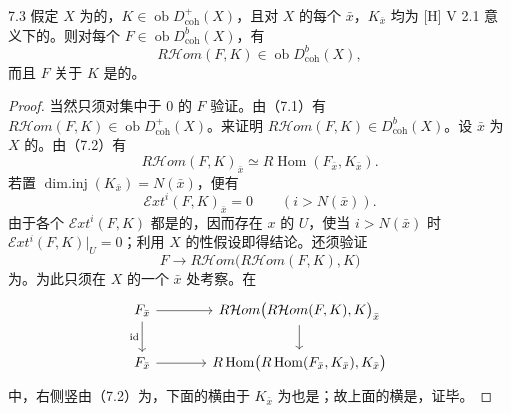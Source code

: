 \begin{SGAresult}{}{7.3}
假定 $X$ 为的，$K\in\operatorname{ob}D^+_{\mathrm{coh}}(X)$，且对 $X$ 的每个 $\bar x$，$K_{\bar x}$ 均为 [H] V 2.1 意义下的。则对每个 $F\in\operatorname{ob}D^b_{\mathrm{coh}}(X)$，有
\[
R\mathcal Hom(F,K)\in\operatorname{ob}D^b_{\mathrm{coh}}(X),
\]
而且 $F$ 关于 $K$ 是的。
\end{SGAresult}
\begin{proof}
当然只须对集中于 $0$ 的 $F$ 验证。由（7.1）有 $R\mathcal Hom(F,K)\in\operatorname{ob}D^+_{\mathrm{coh}}(X)$。来证明 $R\mathcal Hom(F,K)\in D^b_{\mathrm{coh}}(X)$。设 $\bar x$ 为 $X$ 的。由（7.2）有
\[
R\mathcal Hom(F,K)_{\bar x}\simeq R\operatorname{Hom}(F_{\bar x},K_{\bar x}).
\]
若置 $\operatorname{dim.inj}(K_{\bar x})=N(\bar x)$，便有
\[
\mathcal Ext^i(F,K)_{\bar x}=0\qquad(i>N(\bar x)).
\]
由于各个 $\mathcal Ext^i(F,K)$ 都是的，因而存在 $x$ 的 $U$，使当 $i>N(\bar x)$ 时 $\mathcal Ext^i(F,K)|_U=0$；利用 $X$ 的性假设即得结论。还须验证
\[
F\longrightarrow R\mathcal Hom\bigl(R\mathcal Hom(F,K),K\bigr)
\]
为。为此只须在 $X$ 的一个 $\bar x$ 处考察。在
\[
\begin{tikzcd}[column sep=large]
F_{\bar x}\arrow[r]\arrow[d,"\mathrm{id}"']&
R\mathcal Hom\bigl(R\mathcal Hom(F,K),K\bigr)_{\bar x}\arrow[d]\\
F_{\bar x}\arrow[r]&R\operatorname{Hom}\bigl(R\operatorname{Hom}(F_{\bar x},K_{\bar x}),K_{\bar x}\bigr)
\end{tikzcd}
\]
中，右侧竖由（7.2）为，下面的横由于 $K_{\bar x}$ 为也是；故上面的横是，证毕。
\end{proof}

